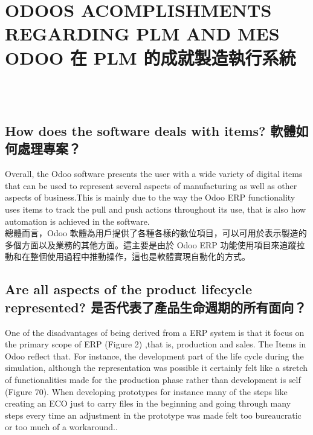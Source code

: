 \chapter{ODOOS ACOMPLISHMENTS REGARDING PLM AND MES ODOO 在 PLM 的成就製造執行系統} 
\setcounter{page}{72}  %

\fontsize{12}{2.5pt}\selectfont {This chapter aims to summarize the strengths and weaknesses of the Odoo software focusing on the questions raised on section 4.2. It will also comment Odoo functionalities or lack thereof noticed throughout the simulation also taking the questions into account.}\\[1pt]

\fontsize{12}{2.5pt}\selectfont {本章旨在總結 Odoo 軟體的優點和缺點重點關注4.2節提出的問題。 它還會評論 Odoo 功能或考慮到問題，整個模擬過程中也注意到缺乏這一點。}\\[15pt]

\section{How does the software deals with items? 軟體如何處理專案？}
\fontsize{12pt}{2.5pt}\selectfont
{Overall, the Odoo software presents the user with a wide variety of digital items that can be used to represent several aspects of
manufacturing as well as other aspects of business.This is mainly due to the way the Odoo ERP functionality uses items to track the pull and push actions throughout its use, that is also how automation is achieved in the software.}\\[1pt]

\fontsize{12pt}{2.5pt}\selectfont 
{總體而言，Odoo 軟體為用戶提供了各種各樣的數位項目，可以可用於表示製造的多個方面以及業務的其他方面。這主要是由於 Odoo ERP 功能使用項目來追蹤拉動和在整個使用過程中推動操作，這也是軟體實現自動化的方式。}\\[1pt]

\section{Are all aspects of the product lifecycle represented? 是否代表了產品生命週期的所有面向？}
\fontsize{12pt}{2.5pt}\selectfont 
{One of the disadvantages of being derived from a ERP system is that it focus on the primary scope of ERP (Figure 2) ,that is,
production and sales. The Items in Odoo reflect that. For instance, the development part of the life cycle during the simulation, although the representation was possible it certainly felt like a stretch of functionalities made for the production phase rather than development is self (Figure 70). When developing prototypes for instance many of the steps like creating an ECO just to carry files in the beginning and going through many steps every time an adjustment in the prototype was made felt too bureaucratic or too much of a workaround..}\\[1pt]

